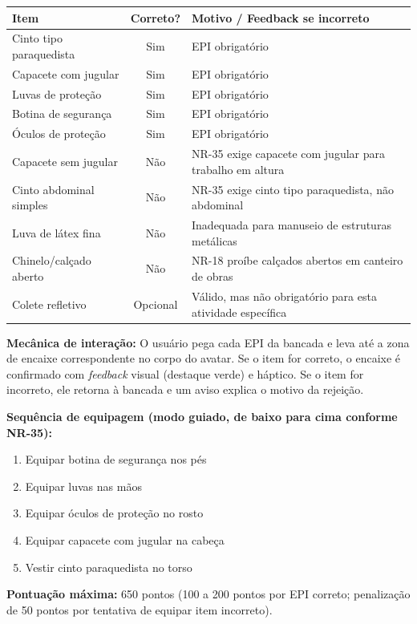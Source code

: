 \begin{table}[h]
\centering
\small
\begin{tabular}{lcp{5.5cm}}
\hline
\textbf{Item} & \textbf{Correto?} & \textbf{Motivo / Feedback se incorreto} \\
\hline
Cinto tipo paraquedista & Sim & EPI obrigatório \\
Capacete com jugular & Sim & EPI obrigatório \\
Luvas de proteção & Sim & EPI obrigatório \\
Botina de segurança & Sim & EPI obrigatório \\
Óculos de proteção & Sim & EPI obrigatório \\
Capacete sem jugular & Não & NR-35 exige capacete com jugular para trabalho em altura \\
Cinto abdominal simples & Não & NR-35 exige cinto tipo paraquedista, não abdominal \\
Luva de látex fina & Não & Inadequada para manuseio de estruturas metálicas \\
Chinelo/calçado aberto & Não & NR-18 proíbe calçados abertos em canteiro de obras \\
Colete refletivo & Opcional & Válido, mas não obrigatório para esta atividade específica \\
\hline
\end{tabular}
\end{table}

\textbf{Mecânica de interação:} O usuário pega cada EPI da bancada e leva até a zona de encaixe correspondente no corpo do avatar. Se o item for correto, o encaixe é confirmado com \textit{feedback} visual (destaque verde) e háptico. Se o item for incorreto, ele retorna à bancada e um aviso explica o motivo da rejeição.

\textbf{Sequência de equipagem (modo guiado, de baixo para cima conforme NR-35):}

\begin{enumerate}
    \item Equipar botina de segurança nos pés
    \item Equipar luvas nas mãos
    \item Equipar óculos de proteção no rosto
    \item Equipar capacete com jugular na cabeça
    \item Vestir cinto paraquedista no torso
\end{enumerate}

\textbf{Pontuação máxima:} 650 pontos (100 a 200 pontos por EPI correto; penalização de 50 pontos por tentativa de equipar item incorreto).

